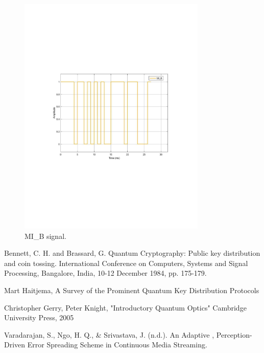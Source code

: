 \begin{figure}[h]
    \centering
        \includegraphics[clip, trim=3cm 9.0cm 2cm 7cm, width=0.80\textwidth]{./sdf/bb84_with_discrete_variables/figures_raw/mib.pdf}
    \caption{MI\_B signal. }\label{mib}
\end{figure}


\begin{thebibliography}{2}
	Bennett, C. H. and Brassard,
	G. Quantum Cryptography: Public key distribution and coin tossing.
	International Conference on Computers, Systems and Signal Processing, Bangalore, India, 10-12 December 1984, pp. 175-179.
	
	Mart Haitjema, A Survey of the Prominent Quantum Key Distribution Protocols
	
	Christopher Gerry, Peter Knight, "Introductory Quantum Optics" Cambridge University Press, 2005
	
	Varadarajan, S., Ngo, H. Q., \& Srivastava, J. (n.d.). An Adaptive , Perception-Driven Error Spreading Scheme in Continuous Media Streaming.
	
\end{thebibliography}
\cleardoublepage

